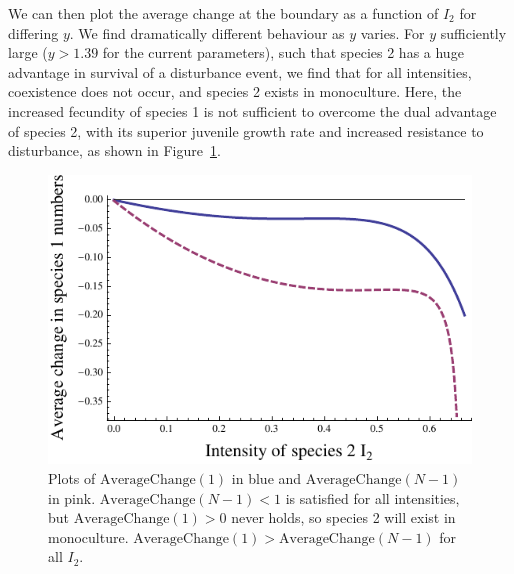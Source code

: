 \documentclass[preprint,10pt,reqno]{amsart}
\begin{document}
We can then plot the average change at the boundary as a function of $I_2$ for differing $y$. We find dramatically different behaviour as $y$ varies. For $y$ sufficiently large ($y>1.39$ for the current parameters), such that species 2 has a huge advantage in survival of a disturbance event, we find that for all intensities, coexistence does not occur, and species 2 exists in monoculture. Here, the increased fecundity of species 1 is not sufficient to overcome the dual advantage of species 2, with its superior juvenile growth rate and increased resistance to disturbance, as shown in Figure~\ref{largey}.
\begin{figure}[htbp]
\includegraphics[width=4.5in]{highy}
\caption{Plots of $\text{AverageChange}(1)$ in blue and $\text{AverageChange}(N-1)$ in pink. $\text{AverageChange}(N-1)<1$ is satisfied for all intensities, but $\text{AverageChange}(1)>0$ never holds, so species 2 will exist in monoculture. $\text{AverageChange}(1)>\text{AverageChange}(N-1)$ for all $I_2$.}
\label{largey}
\end{figure}
\end{document}
